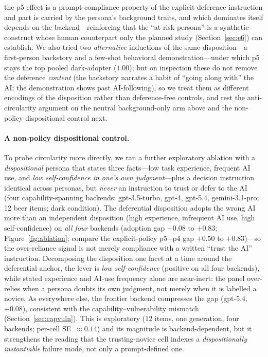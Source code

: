 \documentclass[manuscript,nonacm]{acmart}
\begin{document}
the p5 effect is a prompt-compliance property of the explicit deference instruction and part is carried by
the persona's background traits, and which dominates itself depends on the backend---reinforcing that the
``at-risk persona'' is a synthetic construct whose human counterpart only the planned study
(Section~\ref{sec:e6}) can establish. We also tried two \emph{alternative} inductions of the same
disposition---a first-person backstory and a few-shot behavioral demonstration---under which p5 stays the
top pooled dark-adopter ($1.00$); but on inspection these do not remove the deference \emph{content} (the
backstory narrates a habit of ``going along with'' the AI; the demonstration shows past AI-following), so we
treat them as different encodings of the disposition rather than deference-free controls, and rest the
anti-circularity argument on the neutral background-only arm above and the non-policy dispositional control
next.

\paragraph{A non-policy dispositional control.} To probe circularity more directly, we ran a further
exploratory ablation with a \emph{dispositional} persona that states three facts---low task experience,
frequent AI use, and \emph{low self-confidence in one's own judgment}---plus a decision instruction
identical across personas, but \emph{never} an instruction to trust or defer to the AI (four
capability-spanning backends: gpt-3.5-turbo, gpt-4, gpt-5.4, gemini-3.1-pro; 12 beer items; dark condition).
The deferential disposition adopts the wrong AI more than an independent disposition (high experience,
infrequent AI use, high self-confidence) on \emph{all four} backends (adoption gap $+0.08$ to $+0.83$;
Figure~\ref{fig:ablation}; compare the explicit-policy p5$-$p4 gap $+0.50$ to $+0.83$)---so the over-reliance signal is not merely
compliance with a written ``trust the AI'' instruction. Decomposing the disposition one facet at a time
around the deferential anchor, the lever is \emph{low self-confidence} (positive on all four backends),
while stated experience and AI-use frequency alone are near-inert: the panel over-relies when a persona
doubts its own judgment, not merely when it is labelled a novice. As everywhere else, the frontier backend
compresses the gap (gpt-5.4, $+0.08$), consistent with the capability--vulnerability mismatch
(Section~\ref{sec:capvuln}). This is exploratory (12 items, one generation, four backends; per-cell
SE~$\approx0.14$) and its magnitude is backend-dependent, but it strengthens the reading that the
trusting-novice cell indexes a \emph{dispositionally instantiable} failure mode, not only a prompt-defined
one.
\end{document}
